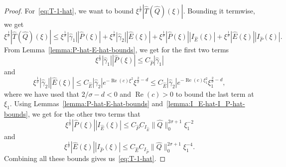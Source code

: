 \documentclass[11pt]{article}
\DeclareMathOperator{\real}{Re}
\begin{document}
\begin{proof}
  For~\eqref{eq:T-1-hat}, we want to bound
  \(\xi^{\frac{1}{\sigma}}|\hat{T}(\hat{Q})(\xi)|\). Bounding it
  termwise, we get
  \begin{equation*}
    \xi^{\frac{1}{\sigma}}|\hat{T}(\hat{Q})(\xi)| \leq
    \xi^{\frac{1}{\sigma}}|\hat{\gamma}_{1}| |\hat{P}(\xi)|
    + \xi^{\frac{1}{\sigma}}|\hat{\gamma}_{2}| |\hat{E}(\xi)|
    + \xi^{\frac{1}{\sigma}}|\hat{P}(\xi)||I_{\hat{E}}(\xi)|
    + \xi^{\frac{1}{\sigma}}|\hat{E}(\xi)||I_{\hat{P}}(\xi)|.
  \end{equation*}
  From Lemma~\ref{lemma:P-hat-E-hat-bounds}, we get for the first two
  terms
  \begin{equation*}
    \xi^{\frac{1}{\sigma}}|\hat{\gamma}_{1}| |\hat{P}(\xi)| \leq C_{\hat{P}}|\hat{\gamma}_{1}|
  \end{equation*}
  and
  \begin{equation*}
    \xi^{\frac{1}{\sigma}}|\hat{\gamma}_{2}| |\hat{E}(\xi)|
    \leq C_{\hat{E}}|\hat{\gamma}_{2}|e^{-\real(c)\xi^{2}}\xi^{\frac{2}{\sigma} - d}
    \leq C_{\hat{E}}|\hat{\gamma}_{2}|e^{-\real(c)\xi_{1}^{2}}\xi_{1}^{\frac{2}{\sigma} - d},
  \end{equation*}
  where we have used that \(2 / \sigma - d < 0\) and \(\real(c) > 0\)
  to bound the last term at \(\xi_{1}\). Using
  Lemmas~\ref{lemma:P-hat-E-hat-bounds}
  and~\ref{lemma:I_E-hat-I_P-hat-bounds}, we get for the other two
  terms that
  \begin{equation*}
    \xi^{\frac{1}{\sigma}}|\hat{P}(\xi)||I_{\hat{E}}(\xi)|
    \leq C_{\hat{P}}C_{I_{\hat{E}}}\|\hat{Q}\|_{0}^{2\sigma + 1}\xi_{1}^{-2}
  \end{equation*}
  and
  \begin{equation*}
    \xi^{\frac{1}{\sigma}}|\hat{E}(\xi)||I_{\hat{P}}(\xi)|
    \leq C_{\hat{E}}C_{I_{\hat{P}}}\|\hat{Q}\|_{0}^{2\sigma + 1}\xi_{1}^{-4}.
  \end{equation*}
  Combining all these bounds gives us~\eqref{eq:T-1-hat}.


\end{proof}
\end{document}
